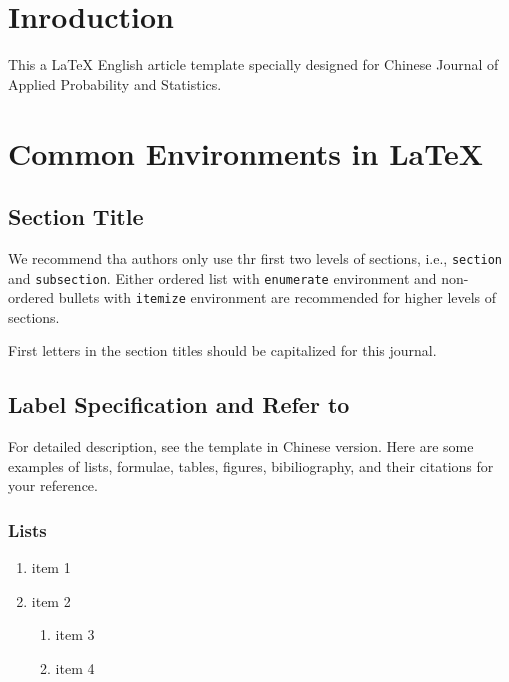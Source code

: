 \documentclass[English]{APSart}
\begin{document}
\baselineskip17.5pt
\pagewiselinenumbers   %

\section{Inroduction}
This a \LaTeX{} English article template specially designed for Chinese Journal of Applied Probability and Statistics. 
\section{Common Environments in \LaTeX{}}

\subsection{Section Title}
We recommend tha authors only use thr first two levels of sections, i.e., \texttt{section} and \texttt{subsection}. Either ordered list with \texttt{enumerate} environment and non-ordered bullets with \texttt{itemize} environment are recommended for higher levels of sections. 
\begin{remark}
First letters in the section titles should be capitalized for this journal.  
\end{remark}
\subsection{Label Specification and Refer to}
For detailed description, see the template in Chinese version.
Here are some examples of lists, formulae, tables, figures, bibiliography, and their citations for your reference.

\subsubsection{Lists}
\begin{enumerate}[leftmargin=7.8mm,itemsep=-0.1ex,label=\arabic*)]
	\item item 1
	\item item 2
	\begin{enumerate}[leftmargin=7.8mm,itemsep=-0.1ex,label=(\alph*)]
		\item item 3
		\item item 4
	\end{enumerate}
\end{enumerate}
\end{document}

